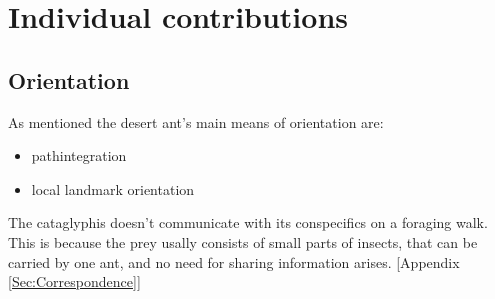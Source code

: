 \documentclass[11pt]{article}
\begin{document}
\section{Individual contributions}
\subsection{Orientation}
As mentioned the desert ant's main means of orientation are:
\begin{itemize}
\item pathintegration
\item local landmark orientation
\end{itemize}
The cataglyphis doesn't communicate with its conspecifics on a foraging walk.
This is because the prey usally consists of small parts of insects, that can be carried by one ant, and no need for sharing information arises. [Appendix \ref{Sec:Correspondence}]
\end{document}
